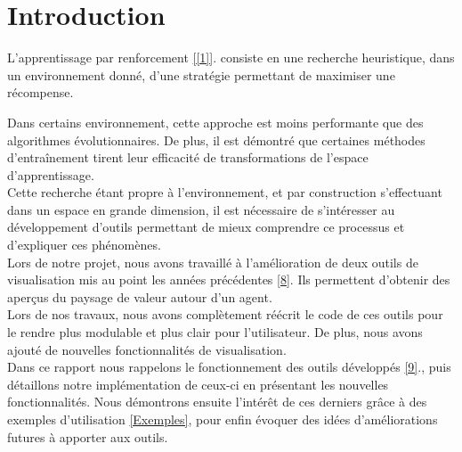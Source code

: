 \documentclass[12pt]{article}
\begin{document}
\newpage																		

\setlength{\parindent}{2ex}

\section*{Introduction}

L’apprentissage par renforcement \ref{[1]}. consiste en une recherche heuristique, dans un environnement donné, d’une stratégie permettant de maximiser une récompense. \par

Dans certains environnement, cette approche est moins performante que des algorithmes évolutionnaires. De plus, il est démontré que certaines méthodes d’entraînement tirent leur efficacité de transformations de l’espace d’apprentissage. \\

Cette recherche étant propre à l’environnement, et par construction s’effectuant dans un espace en grande dimension, il est nécessaire de s’intéresser au développement d’outils permettant de mieux comprendre ce processus et d’expliquer ces phénomènes. \\

Lors de notre projet, nous avons travaillé à l’amélioration de deux outils de visualisation mis au point les années précédentes \href{https://github.com/DevMaelFranceschetti/PAnd_Swimmer/blob/master/paper_study_Swimmer.pdf}{[8]}. Ils permettent d’obtenir des aperçus du paysage de valeur autour d’un agent. \\

Lors de nos travaux, nous avons complètement réécrit le code de ces outils pour le rendre plus modulable et plus clair pour l’utilisateur. De plus, nous avons ajouté de nouvelles fonctionnalités de visualisation. \\

Dans ce rapport nous rappelons le fonctionnement des outils développés \href{https://github.com/DevMaelFranceschetti/PAnd_Swimmer }{[9]}., puis détaillons notre implémentation de ceux-ci en présentant les nouvelles fonctionnalités. Nous démontrons ensuite l'intérêt de ces derniers grâce à des exemples d'utilisation \ref{Exemples}, pour enfin évoquer des idées d'améliorations futures à apporter aux outils. \\

\newpage

\renewcommand*\contentsname{Table des Matières}
\tableofcontents 
\end{document}

